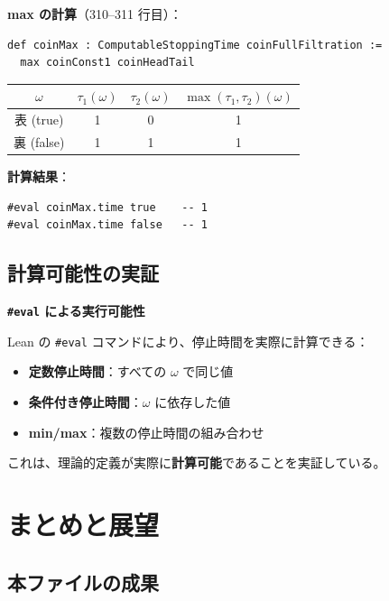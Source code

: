 \documentclass[12pt,a4paper,ja=standard]{bxjsarticle}
\theoremstyle{definition}
\begin{document}
\begin{computation}
\textbf{max の計算}（310--311 行目）：
\begin{verbatim}
def coinMax : ComputableStoppingTime coinFullFiltration :=
  max coinConst1 coinHeadTail
\end{verbatim}

\begin{center}
\begin{tabular}{|c|c|c|c|}
\hline
$\omega$ & $\tau_1(\omega)$ & $\tau_2(\omega)$ & $\max(\tau_1, \tau_2)(\omega)$ \\
\hline
表 (true) & 1 & 0 & 1 \\
裏 (false) & 1 & 1 & 1 \\
\hline
\end{tabular}
\end{center}

\textbf{計算結果}：
\begin{verbatim}
#eval coinMax.time true    -- 1
#eval coinMax.time false   -- 1
\end{verbatim}
\end{computation}

\subsection{計算可能性の実証}

\begin{keypoint}
\textbf{\texttt{\#eval} による実行可能性}

Lean の \texttt{\#eval} コマンドにより、停止時間を実際に計算できる：

\begin{itemize}
    \item \textbf{定数停止時間}：すべての $\omega$ で同じ値
    \item \textbf{条件付き停止時間}：$\omega$ に依存した値
    \item \textbf{min/max}：複数の停止時間の組み合わせ
\end{itemize}

これは、理論的定義が実際に\textbf{計算可能}であることを実証している。
\end{keypoint}

\section{まとめと展望}\label{sec:conclusion}

\subsection{本ファイルの成果}
\end{document}
